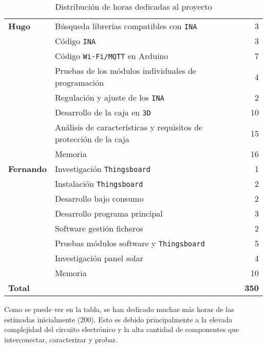 \begin{table}[H]
\begin{tabular}[c]{llr}
        \textbf{Hugo}       & Búsqueda librerías compatibles con \texttt{INA}                   & 3   \\
                            & Código \texttt{INA}                                               & 3   \\
                            & Código \texttt{Wi-Fi/MQTT} en Arduino                              & 7   \\
                            & Pruebas de los módulos individuales de programación               & 4   \\
                            & Regulación y ajuste de los \texttt{INA}                           & 2   \\
                            & Desarrollo de la caja en \texttt{3D}                              & 10  \\
                            & Análisis de características y requisitos de protección de la caja & 15  \\
                            & Memoria                                                           & 16  \\ \midrule

        \textbf{Fernando}   & Investigación \texttt{Thingsboard}                                & 1   \\
                            & Instalación \texttt{Thingsboard}                                  & 2   \\
                            & Desarrollo bajo consumo                                           & 2   \\
                            & Desarrollo programa principal                                     & 3   \\
                            & Software gestión ficheros                                         & 2   \\
                            & Pruebas módulos software y \texttt{Thingsboard}                   & 5   \\
                            & Investigación panel solar                                         & 4   \\
                            & Memoria                                                           & 10  \\ \midrule

        \textbf{Total}      &                                                                   & \textbf{350} \\ \bottomrule

    \end{tabular}
\caption{Distribución de horas dedicadas al proyecto}
\label{tab:horas}
\end{table}

Como se puede ver en la tabla, se han dedicado muchas más horas de las estimadas inicialmente (200). Esto es debido principalmente a la elevada complejidad del circuito electrónico y la alta cantidad de componentes que interconectar, caracterizar y probar.